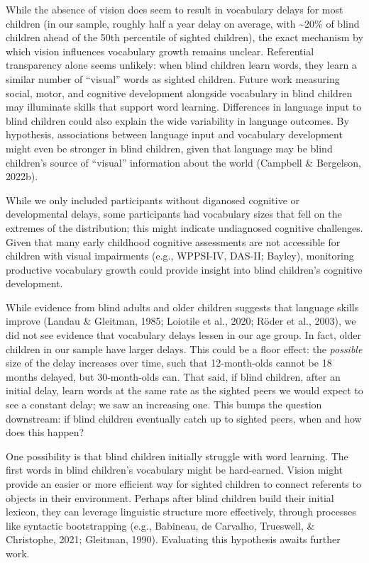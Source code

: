 \documentclass[
  man,floatsintext]{apa6}
\begin{document}
While the absence of vision does seem to result in vocabulary delays for most children (in our sample, roughly half a year delay on average, with \textasciitilde20\% of blind children ahead of the 50th percentile of sighted children), the exact mechanism by which vision influences vocabulary growth remains unclear. Referential transparency alone seems unlikely: when blind children learn words, they learn a similar number of ``visual'' words as sighted children. Future work measuring social, motor, and cognitive development alongside vocabulary in blind children may illuminate skills that support word learning. Differences in language input to blind children could also explain the wide variability in language outcomes. By hypothesis, associations between language input and vocabulary development might even be stronger in blind children, given that language may be blind children's source of ``visual'' information about the world (Campbell \& Bergelson, 2022b).

While we only included participants without diganosed cognitive or developmental delays, some participants had vocabulary sizes that fell on the extremes of the distribution; this might indicate undiagnosed cognitive challenges. Given that many early childhood cognitive assessments are not accessible for children with visual impairments (e.g., WPPSI-IV, DAS-II; Bayley), monitoring productive vocabulary growth could provide insight into blind children's cognitive development.

While evidence from blind adults and older children suggests that language skills improve (Landau \& Gleitman, 1985; Loiotile et al., 2020; Röder et al., 2003), we did not see evidence that vocabulary delays lessen in our age group. In fact, older children in our sample have larger delays. This could be a floor effect: the \emph{possible} size of the delay increases over time, such that 12-month-olds cannot be 18 months delayed, but 30-month-olds can. That said, if blind children, after an initial delay, learn words at the same rate as the sighted peers we would expect to see a constant delay; we saw an increasing one. This bumps the question downstream: if blind children eventually catch up to sighted peers, when and how does this happen?

One possibility is that blind children initially struggle with word learning. The first words in blind children's vocabulary might be hard-earned. Vision might provide an easier or more efficient way for sighted children to connect referents to objects in their environment. Perhaps after blind children build their initial lexicon, they can leverage linguistic structure more effectively, through processes like syntactic bootstrapping (e.g., Babineau, de Carvalho, Trueswell, \& Christophe, 2021; Gleitman, 1990). Evaluating this hypothesis awaits further work.
\end{document}
